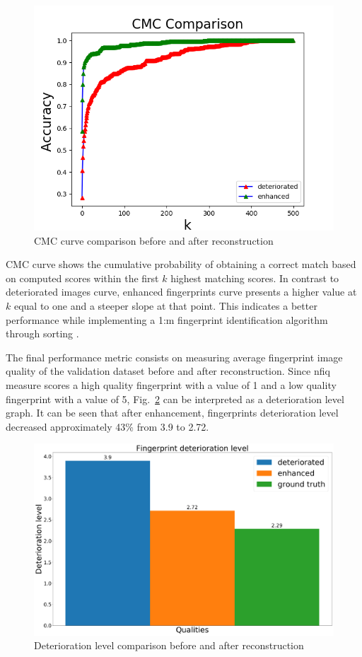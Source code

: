 \documentclass[a4paper,fleqn]{cas-dc}
\begin{document}
\begin{figure}[htbp]
\centerline{\includegraphics[scale=0.5]{figs/cmc_comparison.png}}
\caption{CMC curve comparison before and after reconstruction}
\label{fig10}
\end{figure}

CMC curve shows the cumulative probability of obtaining a correct match based on computed scores within the first $k$ highest matching scores. In contrast to deteriorated images curve, enhanced fingerprints curve presents a higher value at $k$ equal to one and a steeper slope at that point. This indicates a better performance while implementing a 1:m fingerprint identification algorithm through sorting \cite{RROCCMC}.

The final performance metric consists on measuring average fingerprint image quality of the validation dataset before and after reconstruction. Since nfiq measure scores a high quality fingerprint with a value of 1 and a low quality fingerprint with a value of 5, Fig.~\ref{fig11} can be interpreted as a deterioration level graph. It can be seen that after enhancement, fingerprints deterioration level decreased approximately 43\% from 3.9 to 2.72.

\begin{figure}[htbp]
\centerline{\includegraphics[scale=0.13]{figs/mean_qualities.png}}
\caption{Deterioration level comparison before and after reconstruction}
\label{fig11}
\end{figure}
\end{document}

